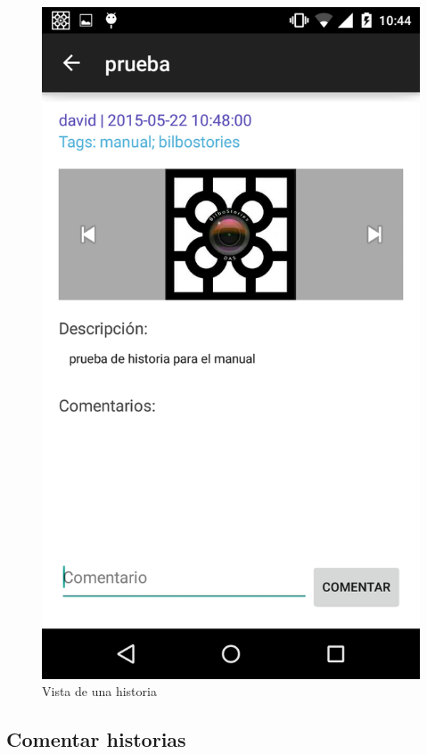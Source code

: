 \documentclass[11pt,a4paper, titlepage]{article}
\begin{document}
	\begin{figure}[hbtp]
		\centering
		\includegraphics[scale = 0.25 ]{img/15}
		\caption{Vista de una historia}
		\label{p22}
	\end{figure}
	
	\FloatBarrier
	\newpage
	\subsection{Comentar historias}
	
\end{document}

